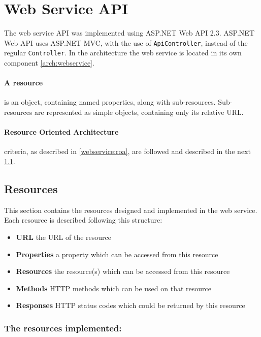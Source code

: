 \section{Web Service API}\label{design:web_service}
The web service API was implemented using ASP.NET Web API 2.3\cite{aspnet_webapi}.
ASP.NET Web API uses ASP.NET MVC\cite{aspnet_mvc}, with the use of \texttt{ApiController}, instead of the regular \texttt{Controller}.
In the architecture the web service is located in its own component \cref{arch:webservice}.

\paragraph{A resource} is an object, containing named properties, along with sub-resources.
Sub-resources are represented as simple objects, containing only its relative URL.



\paragraph{Resource Oriented Architecture} criteria, as described in \cref{webservice:roa}, are followed and described in the next \cref{webservice:resources}.

\subsection{Resources}\label{webservice:resources}
This section contains the resources designed and implemented in the web service.
Each resource is described following this structure:
\begin{itemize}
\item \textbf{URL} the URL of the resource
\item \textbf{Properties} a property which can be accessed from this resource
\item \textbf{Resources} the resource(s) which can be accessed from this resource
\item \textbf{Methods} HTTP methods which can be used on that resource
\item \textbf{Responses} HTTP status codes which could be returned by this resource
\end{itemize}

\subsubsection{The resources implemented:}

